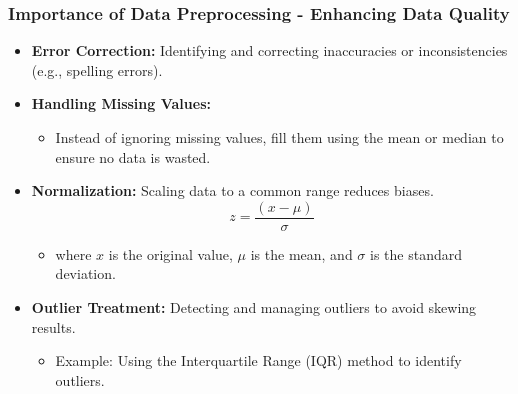 \documentclass[aspectratio=169]{beamer}
\begin{document}
\begin{frame}[fragile]
    \frametitle{Importance of Data Preprocessing - Enhancing Data Quality}
    \begin{itemize}
        \item \textbf{Error Correction:} Identifying and correcting inaccuracies or inconsistencies (e.g., spelling errors).
        \item \textbf{Handling Missing Values:}
            \begin{itemize}
                \item Instead of ignoring missing values, fill them using the mean or median to ensure no data is wasted.
            \end{itemize}
        \item \textbf{Normalization:} Scaling data to a common range reduces biases.
            \begin{equation}
                z = \frac{(x - \mu)}{\sigma}
            \end{equation}
            \begin{itemize}
                \item where \( x \) is the original value, \( \mu \) is the mean, and \( \sigma \) is the standard deviation.
            \end{itemize}
        \item \textbf{Outlier Treatment:} Detecting and managing outliers to avoid skewing results.
            \begin{itemize}
                \item Example: Using the Interquartile Range (IQR) method to identify outliers.
            \end{itemize}
    \end{itemize}
\end{frame}
\end{document}

